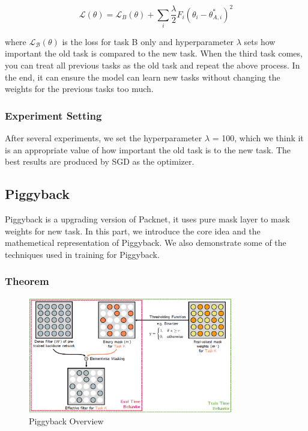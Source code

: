 \begin{equation}
\mathcal{L}(\theta)=\mathcal{L}_{B}(\theta)+\sum_{i} \frac{\lambda}{2} F_{i}\left(\theta_{i}-\theta_{A, i}^{*}\right)^{2}
\end{equation}

where $\mathcal{L}_{\mathcal{B}}(\theta)$ is the loss for task B only and hyperparameter $\lambda$ sets how important the old task is compared to the new task. When the third task comes, you can treat all previous tasks as the old task and repeat the above process. In the end, it can ensure the model can learn new tasks without changing the weights for the previous tasks too much. 

\subsubsection{Experiment Setting}
After several experiments, we set the hyperparameter $\lambda$ = 100, which we think it is an appropriate value of how important the old task is to the new task. The best results are produced by SGD as the optimizer.


\subsection{Piggyback}
Piggyback is a upgrading version of Packnet, it uses pure mask layer to mask weights for new task. In this part, we introduce the core idea and the mathemetical representation of Piggyback. We also demonstrate some of the techniques used in training for Piggyback.

\subsubsection{Theorem}
\begin{figure}[h]
  \centering
  \includegraphics[width=0.8\textwidth]{figure/piggyback.png}
  \caption{Piggyback Overview}
  \label{piggy}
\end{figure}

